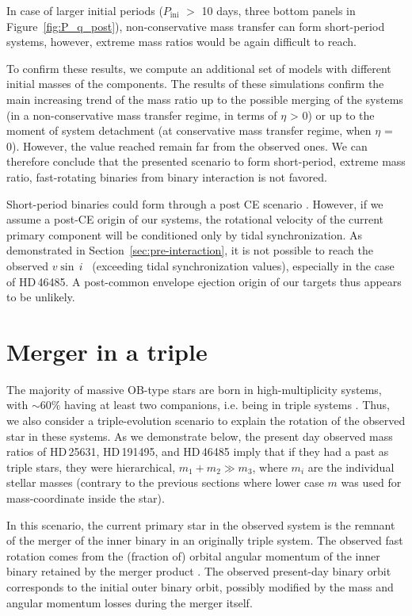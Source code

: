 \documentclass{aa}
\newcommand{\vsini} {$v\sin\,i$}
\DeclareRobustCommand{\Figref}[1]{Figure~\ref{#1}}
\DeclareRobustCommand{\Secref}[1]{Section~\ref{#1}}
\begin{document}
In case of larger initial periods ($P_\mathrm{ini}$ $>$ 10 days, three bottom panels in \Figref{fig:P_q_post}), non-conservative mass transfer can form short-period systems, however, extreme mass ratios would be again difficult to reach.

To confirm these results, we compute an additional set of models with different initial masses of the components. 
The results of these simulations confirm the main increasing trend of the mass ratio up to the possible merging of the systems (in a non-conservative mass transfer regime, in terms of $\eta$ > 0) or up to the moment of system detachment (at conservative mass transfer regime, when  $\eta$ = 0).
However, the value reached remain far from the observed ones.
We can therefore conclude that the presented scenario to form short-period, extreme mass ratio, fast-rotating binaries from binary interaction is not favored.


Short-period binaries could form through a
post CE scenario \citep[see channel 4 in][]{Willems_2004}. 
However, if we assume a post-CE origin of our systems, the rotational velocity of the current primary component will be conditioned only by tidal synchronization. As demonstrated in \Secref{sec:pre-interaction}, it is not possible to reach the observed \vsini~ (exceeding tidal synchronization values), especially in the case of HD\,46485.
A post-common envelope ejection origin of our targets thus appears to be unlikely.




\section{Merger in a triple}
\label{sec:triple_scenario}

The majority of massive OB-type stars are born in high-multiplicity
systems, with $\sim60\%$ having at least two companions, i.e. being in triple systems
\citep[e.g.,][]{moe_2017, Offner_2022}. Thus, we also consider a
triple-evolution scenario to explain the rotation of the observed star
in these systems. As we demonstrate below, the present day observed
mass ratios of HD\,25631, HD\,191495, and HD\,46485 imply that if they
had a past as triple stars, they were hierarchical, $m_1+m_2 \gg m_3$,
where $m_i$ are the individual stellar masses (contrary to the previous
sections where lower case $m$ was used for mass-coordinate inside the star).

In this scenario, the current primary star in the observed system is
the remnant of the merger of the inner binary in an originally triple
system. The observed fast rotation comes from the (fraction of)
orbital angular momentum of the inner binary retained by the merger
product \citep[e.g.,][]{deMink_2014}. The observed present-day binary
orbit corresponds to the initial outer binary orbit, possibly modified
by the mass and angular momentum losses during the merger itself.
\end{document}

